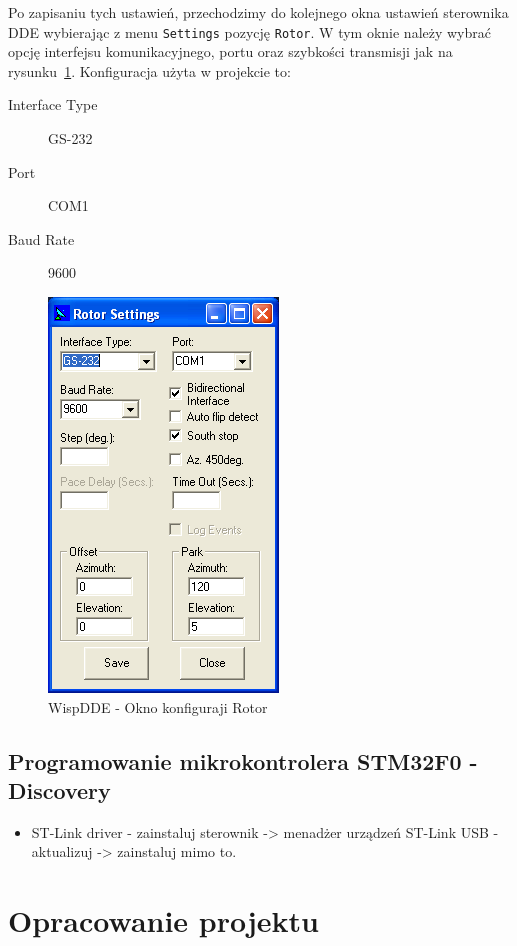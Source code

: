 \documentclass[12pt,a4paper]{article}
\begin{document}
		Po zapisaniu tych ustawień, przechodzimy do kolejnego okna ustawień sterownika DDE wybierając z menu \texttt{Settings} pozycję \texttt{Rotor}. W tym oknie należy wybrać opcję interfejsu komunikacyjnego, portu oraz szybkości transmisji jak na rysunku~\ref{fig:WispDDE_Rotor_settings}. Konfiguracja użyta w projekcie to:
		\begin{description}
			\item[Interface Type] GS-232
			\item[Port] COM1
			\item[Baud Rate] 9600
		\end{description}
		
		\begin{figure}[!htb]
			\begin{center}
				\includegraphics[scale=0.5]{screen5}
			\end{center}
			\caption{WispDDE - Okno konfiguraji Rotor}
			\label{fig:WispDDE_Rotor_settings}
		\end{figure}
	
		\subsection{Programowanie mikrokontrolera STM32F0 - Discovery}
		\begin{itemize}
			\item ST-Link driver - zainstaluj sterownik -> menadżer urządzeń ST-Link USB - aktualizuj -> zainstaluj mimo to.
		\end{itemize}

	\section{Opracowanie projektu}
\end{document}
